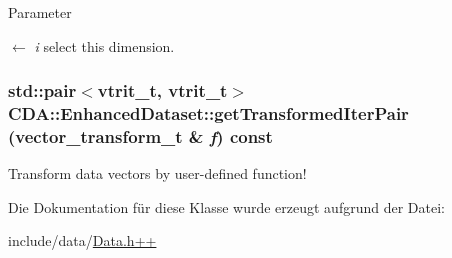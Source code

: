 \begin{DoxyParams}{Parameter}
\item[\mbox{$\leftarrow$} {\em i}]select this dimension. \end{DoxyParams}
\hypertarget{classCDA_1_1EnhancedDataset_a7882f2a098711508ca8a9c7a6e24dbed}{
\subsubsection[{getTransformedIterPair}]{\setlength{\rightskip}{0pt plus 5cm}std::pair$<$vtrit\_\-t, vtrit\_\-t$>$ CDA::EnhancedDataset::getTransformedIterPair (vector\_\-transform\_\-t \& {\em f}) const}}
\label{classCDA_1_1EnhancedDataset_a7882f2a098711508ca8a9c7a6e24dbed}
Transform data vectors by user-\/defined function! 

Die Dokumentation für diese Klasse wurde erzeugt aufgrund der Datei:\begin{DoxyCompactItemize}
\item 
include/data/\hyperlink{Data_8h_09_09}{Data.h++}\end{DoxyCompactItemize}
